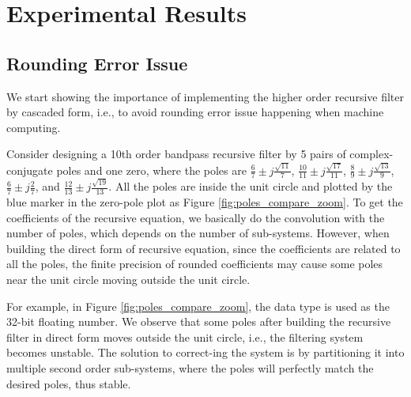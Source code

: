 \section{Experimental Results}
\label{sec:experiment}

\subsection{Rounding Error Issue}

We start showing the importance of implementing the higher order recursive filter by cascaded form, i.e.,
to avoid rounding error issue happening when machine computing. 

Consider designing a 10th order bandpass recursive filter by 5 pairs of complex-conjugate poles
and one zero, where the poles are
$\frac{6}{7} \pm j\frac{\sqrt{11}}{7}$, $\frac{10}{11} \pm j\frac{\sqrt{17}}{11}$, $\frac{8}{9} \pm j\frac{\sqrt{13}}{9}$, $\frac{6}{7} \pm j\frac{2}{7}$,
and $\frac{12}{13} \pm j\frac{\sqrt{19}}{13}$. 
All the poles are inside the unit circle and plotted by the blue marker
in the zero-pole plot as Figure \ref{fig:poles_compare_zoom}.
To get the coefficients of the recursive equation, we basically do the convolution with the number of poles, which depends on
the number of sub-systems. 
However,
when building the direct form of recursive equation,
since the coefficients are related to all the poles,
the finite precision of rounded coefficients
may cause some poles near the unit circle moving outside the unit circle.

For example, in Figure \ref{fig:poles_compare_zoom}, the data type 
is used as the 32-bit floating number.
We observe that some poles after building the recursive filter in direct form 
moves outside the unit circle, i.e., the filtering system becomes unstable.
The solution to correct-ing the system is by partitioning it into multiple second order
sub-systems, where the poles will perfectly match the desired poles, thus stable.


